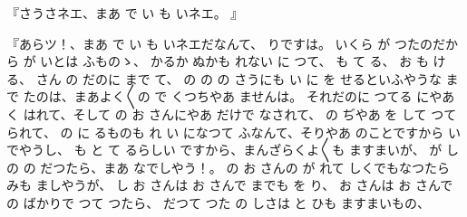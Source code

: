 『さうさネエ、まあ
で
い
も
いネエ。
』

『あらツ！、まあ
で
い
も
いネエだなんて、
りですは。
いくら
が
つたのだから
が
いとは
ふものゝ、
かるか
ぬかも
れない
に
つて、
も
て
る、
お
も
ける、
さん
の
だのに
まで
て、
の
の
の
さうにも
い
に
を
せるといふやうな
まで
たのは、まあよく〳〵の
で
くつちやあ
ませんは。
それだのに
つてる
にやあ
く
はれて、そして
の
お
さんにやあ
だけで
なされて、
の
ぢやあ
を
して
つて
られて、
の
に
るものも
れ
い
になつて
ふなんて、そりやあ
のことですから
いでやうし、
も
と
て
るらしい
ですから、まんざらくよ〳〵も
ますまいが、
が
し
の
の
だつたら、まあ
なでしやう！。
の
お
さんの
が
れて
しくでもなつたら
みも
ましやうが、
し
お
さんは
お
さんで
までも
を
り、
お
さんは
お
さんで
の
ばかりで
つて
つたら、
だつて
つた
の
しさは
と
ひも
ますまいもの、
